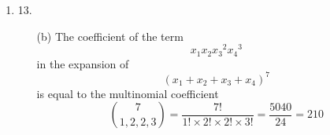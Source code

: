 \documentclass[fleqn]{article}
\newenvironment{answers}{ %
	\begin{enumerate}
		\setlength{\itemsep}{\bigskipamount}
}{\end{enumerate}}
\begin{document}
\begin{answers}
\begin{enumerate}
		Now that we have solved the characteristic equation, we know that the closed form formula is of the form
		\[a_n = A \cdot 3^n + B \cdot 4^n\]

		Solving for \(A\) and \(B\) using the initial conditions we can obtain our closed form formula
		\begin{align*}
			1 &= A \cdot 3^0 + B \cdot 4^0 \\
			1 &= A \cdot 3^1 + B \cdot 4^1 \\
			A + B &= 1 \\
			3A + 4B &= 1 \\
			3A + 3B &= 3 \\
			B &= -2 \\
			A - 2 &= 1 \\
			A &= 3
		\end{align*}

		Finally, our closed form formula is
		\begin{align*}
			a_n &= 3 \cdot 3^n - 2 \cdot 4^n \\
				&= 3^{n+1} - 2^{2n+1}
		\end{align*}

		\item[(d)]
		Given the recursive formula below, a corresponding closed form formula must be found.
		\begin{gather*}
			a_n + 3a_{n-1} = 0 \\
			a_0 = -2
		\end{gather*}
		Rearranging the formula and expanding each term yields the following.
		\begin{align*}
			a_n &= -3a_{n-1} \\
			&= -3(-3a_{n-2}) \\
			&= (-3)^2(a_{n-2}) \\
			&= (-3)^2(-3a_{n-3}) \\
			&= (-3)^3(a_{n-3}) \\
			&= (-3)^3(-3a_{n-4}) \\
			&= (-3)^4(a_{n-4}) \\
			&\vdots \\
			&= (-3)^k(a_{n-k}) \\
			&\vdots \\
			&= (-3)^n(a_{n-n}) \\
			&= (-3)^n(a_{0}) \\
			&= (-3)^n(-2)
		\end{align*}

		Thus the closed form formula is
		\[a_n = -2(-3)^n\]
	\end{enumerate}

	\item[13.]
	\begin{enumerate}
		\item[(b)]
		The coefficient of the term
		\[x_1x_2{x_3}^2{x_4}^3\]
		in the expansion of
		\[(x_1+x_2+x_3+x_4)^7\]
		is equal to the multinomial coefficient
		\[\binom{7}{1, 2, 2, 3} = \frac{7!}{1! \times 2! \times 2! \times 3!} = \frac{5040}{24} = 210\]
	\end{enumerate}

\end{answers}
\end{document}
